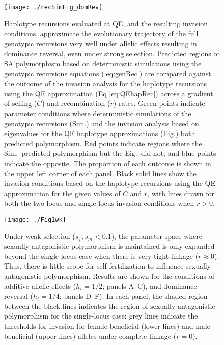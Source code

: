 \documentclass{article}
\begin{document}
\begin{figure}[H] 
\texttt{[image: ./recSimFig\_domRev]}
\caption{Haplotype recursions evaluated at QE, and the resulting invasion conditions, approximate the evolutionary trajectory of the full genotypic recursions very well under allelic effects resulting in dominance reversal, even under strong selection. Predicted regions of SA polymorphism based on deterministic simulations using the genotypic recursions equations (\ref{eq:genRec}) are compared against the outcome of the invasion analysis for the haplotype recursions using the QE approximation (Eq \ref{eq:QEhapRec}) across a gradient of selfing ($C$) and recombination ($r$) rates. Green points indicate parameter conditions where deterministic simulations of the genotypic recursions (Sim.) and the invasion analysis based on eigenvalues for the QE haplotype approximations (Eig.) both predicted polymorphism. Red points indicate regions where the Sim.~predicted polymorphism but the Eig.~did not; and blue points indicate the opposite. The proportion of each outcome is shown in the upper left corner of each panel. Black solid lines show the invasion conditions based on the haplotype recursions using the QE approximation for the given values of $C$ and $r$, with lines drawn for both the two-locus and single-locus invasion conditions when $r > 0$.}
\label{fig:domRevSim}
\end{figure}
\newpage{}


\begin{figure}[H]
\texttt{[image: ./Fig1wk]}
\caption{Under weak selection ($s_f,s_m < 0.1$), the parameter space where sexually antagonistic polymorphism is maintained is only expanded beyond the single-locus case when there is very tight linkage ($r \approx 0$). Thus, there is little scope for self-fertilization to influence sexually antagonistic polymorphism. Results are shown for the conditions of additive allelic effects ($h_i = 1/2$; panels A--C), and dominance reversal ($h_i = 1/4$; panels D--F). In each panel, the shaded region between the black lines indicates the region of sexually antagonistic polymorphism for the single-locus case; grey lines indicate the thresholds for invasion for female-beneficial (lower lines) and male-beneficial (upper lines) alleles under complete linkage ($r = 0$).}
\label{fig:wkFunnelPlots}
\end{figure}
\newpage{}
\end{document}
